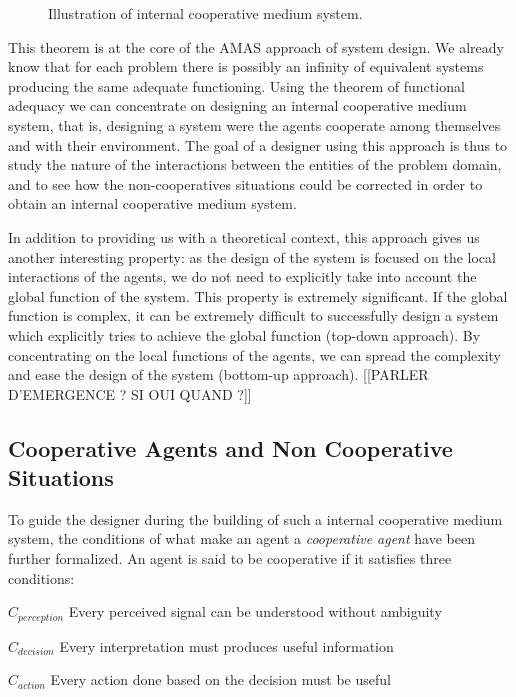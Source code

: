 \begin{figure}
\centering
{}
\hfill
{}

\caption{Illustration of internal cooperative medium system.}
\label{internal_cooperative_comp}
\end{figure}

This theorem is at the core of the AMAS approach of system design. We already know that for each problem there is possibly an infinity of equivalent systems producing the same adequate functioning. Using the theorem of functional adequacy we can concentrate on designing an internal cooperative medium system, that is, designing a system were the agents cooperate among themselves and with their environment. The goal of a designer using this approach is thus to study the nature of the interactions between the entities of the problem domain, and to see how the non-cooperatives situations could be corrected in order to obtain an internal cooperative medium system.

In addition to providing us with a theoretical context, this approach gives us another interesting property: as the design of the system is focused on the local interactions of the agents, we do not need to explicitly take into account the global function of the system. This property is extremely significant. If the global function is complex, it can be extremely difficult to successfully design a system which explicitly tries to achieve the global function (top-down approach). By concentrating on the local functions of the agents, we can spread the complexity and ease the design of the system (bottom-up approach). [[PARLER D'EMERGENCE ? SI OUI QUAND ?]]

\subsection{Cooperative Agents and Non Cooperative Situations}

To guide the designer during the building of such a internal cooperative medium system, the conditions of what make an agent a \emph{cooperative agent} have been further formalized. An agent is said to be cooperative if it satisfies three conditions:
\begin{compactitem}
\item $C_{perception}$ Every perceived signal can be understood without ambiguity
\item $C_{decision}$ Every interpretation must produces useful information
\item $C_{action}$ Every action done based on the decision must be useful
\end{compactitem}


